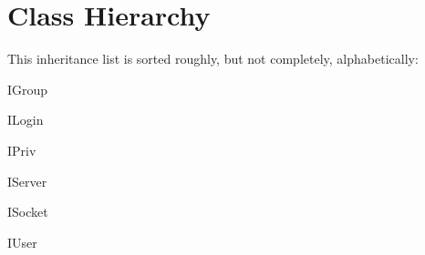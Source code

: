 \section{Class Hierarchy}
This inheritance list is sorted roughly, but not completely, alphabetically\+:\begin{DoxyCompactList}
\item I\+Group\begin{DoxyCompactList}
\item {}
\end{DoxyCompactList}
\item I\+Login\begin{DoxyCompactList}
\item {}
\end{DoxyCompactList}
\item I\+Priv\begin{DoxyCompactList}
\item {}
\end{DoxyCompactList}
\item I\+Server\begin{DoxyCompactList}
\item {}
\end{DoxyCompactList}
\item I\+Socket\begin{DoxyCompactList}
\item {}
\end{DoxyCompactList}
\item I\+User\begin{DoxyCompactList}
\item {}
\end{DoxyCompactList}
\item {}
\end{DoxyCompactList}
